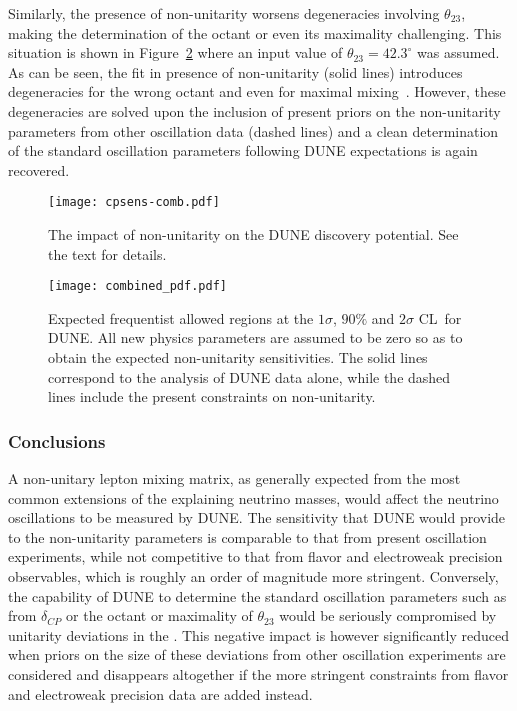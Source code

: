 Similarly, the presence of non-unitarity worsens degeneracies involving $\theta_{23}$, making the determination of the octant or even its maximality challenging.
This situation is shown in Figure~\ref{fig:octant} where an input value of $\theta_{23} = 42.3^\circ$ was assumed. As can be seen, the fit in presence of non-unitarity (solid lines) introduces degeneracies for the wrong octant and even for maximal mixing~\cite{Blennow:2016jkn}. However, these degeneracies are solved upon the inclusion of present priors on the non-unitarity parameters from other oscillation data (dashed lines) and a clean determination of the standard oscillation parameters following DUNE expectations is again recovered.   

\begin{figure}[!t]
\centering
 \texttt{[image: cpsens-comb.pdf]}
\caption[Impact of non-unitarity on the  discovery potential]{The impact of non-unitarity on the DUNE  discovery potential. See the text for details.}
\label{fig:CPsens}
\end{figure}

\begin{figure}
 \texttt{[image: combined\_pdf.pdf]} 
 \begin{center}
  \caption[Expected frequentist allowed regions at the $1 \sigma$,
    $90\%$ and $2 \sigma$ CL\ ]{Expected frequentist allowed regions at the $1 \sigma$,
    $90\%$ and $2 \sigma$ CL\ for DUNE. All new physics parameters
    are assumed to be zero so as to obtain the expected
    non-unitarity sensitivities. The solid
    lines correspond to the analysis of DUNE data alone, while the
    dashed lines include the present constraints on non-unitarity.
\label{fig:octant}}
 \end{center}
\end{figure}

\subsubsection{Conclusions}
A non-unitary lepton mixing matrix, as generally expected from the most common extensions of the   explaining neutrino masses, would affect the neutrino oscillations to be measured by DUNE. The sensitivity that DUNE would provide to the non-unitarity parameters is comparable to that from present oscillation experiments, while not competitive to that from flavor and electroweak precision observables, which is roughly an order of magnitude more stringent. Conversely, the capability of DUNE to determine the standard oscillation parameters such as  from $\delta_{CP}$ or the octant or maximality of $\theta_{23}$ would be seriously compromised by unitarity deviations in the . This negative impact is however significantly reduced when priors on the size of these deviations from other oscillation experiments are considered and disappears altogether if the more stringent constraints from flavor and electroweak precision data are added instead.

